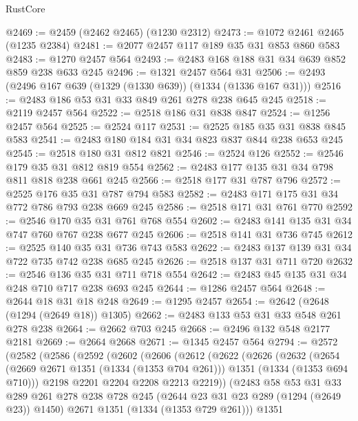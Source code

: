 \begin{lexlean}{RustCore}
\begin{coremodule}
@2469 := @2459 (@2462 @2465) (@1230 @2312)
@2473 := @1072 @2461 @2465 (@1235 @2384)
@2481 := @2077 @2457 @117 @189 @35 @31 @853 @860 @583
@2483 := @1270 @2457 @564
@2493 := @2483 @168 @188 @31 @34 @639 @852 @859 @238 @633 @245
@2496 := @1321 @2457 @564 @31
@2506 := @2493 (@2496 @167 @639 (@1329 (@1330 @639)) (@1334 (@1336 @167 @31)))
@2516 := @2483 @186 @53 @31 @33 @849 @261 @278 @238 @645 @245
@2518 := @2119 @2457 @564
@2522 := @2518 @186 @31 @838 @847
@2524 := @1256 @2457 @564
@2525 := @2524 @117
@2531 := @2525 @185 @35 @31 @838 @845 @583
@2541 := @2483 @180 @184 @31 @34 @823 @837 @844 @238 @653 @245
@2545 := @2518 @180 @31 @812 @821
@2546 := @2524 @126
@2552 := @2546 @179 @35 @31 @812 @819 @554
@2562 := @2483 @177 @135 @31 @34 @798 @811 @818 @238 @661 @245
@2566 := @2518 @177 @31 @787 @796
@2572 := @2525 @176 @35 @31 @787 @794 @583
@2582 := @2483 @171 @175 @31 @34 @772 @786 @793 @238 @669 @245
@2586 := @2518 @171 @31 @761 @770
@2592 := @2546 @170 @35 @31 @761 @768 @554
@2602 := @2483 @141 @135 @31 @34 @747 @760 @767 @238 @677 @245
@2606 := @2518 @141 @31 @736 @745
@2612 := @2525 @140 @35 @31 @736 @743 @583
@2622 := @2483 @137 @139 @31 @34 @722 @735 @742 @238 @685 @245
@2626 := @2518 @137 @31 @711 @720
@2632 := @2546 @136 @35 @31 @711 @718 @554
@2642 := @2483 @45 @135 @31 @34 @248 @710 @717 @238 @693 @245
@2644 := @1286 @2457 @564
@2648 := @2644 @18 @31 @18 @248
@2649 := @1295 @2457
@2654 := @2642 (@2648 (@1294 (@2649 @18)) @1305)
@2662 := @2483 @133 @53 @31 @33 @548 @261 @278 @238
@2664 := @2662 @703 @245
@2668 := @2496 @132 @548 @2177 @2181
@2669 := @2664 @2668
@2671 := @1345 @2457 @564
@2794 := @2572
    (@2582
      (@2586
        (@2592
          (@2602
            (@2606
              (@2612
                (@2622
                  (@2626
                    (@2632
                      (@2654
                        (@2669 @2671 @1351 (@1334 (@1353 @704 @261)))
                        @1351
                        (@1334 (@1353 @694 @710)))
                      @2198
                      @2201
                      @2204
                      @2208
                      @2213
                      @2219))
                  (@2483
                    @58
                    @53
                    @31
                    @33
                    @289
                    @261
                    @278
                    @238
                    @728
                    @245
                    (@2644 @23 @31 @23 @289 (@1294 (@2649 @23)) @1450)
                    @2671
                    @1351
                    (@1334 (@1353 @729 @261)))
                  @1351

\end{coremodule}
\end{lexlean}
